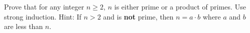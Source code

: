 \begin{questions}
% 
%    
%    
%    
%

\question Prove that for any integer $n\geq 2$, $n$ is either prime or a product of primes. Use strong induction.  Hint: If $n > 2$ and is \textbf{not} prime, then $n = a\cdot b$ where $a$ and $b$ are less than $n$.


\end{questions}
